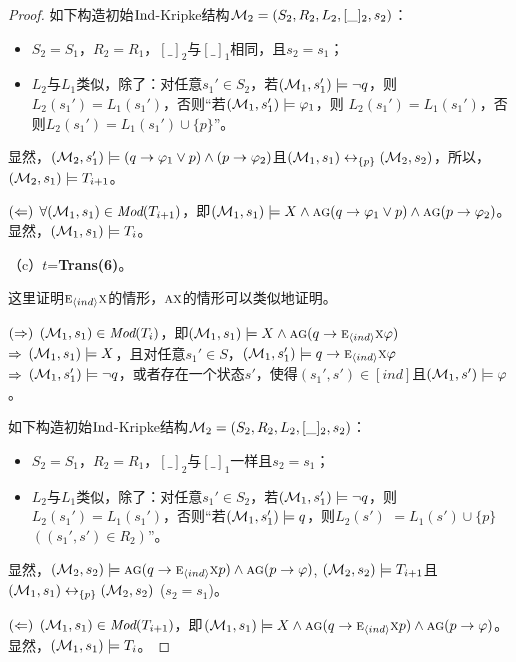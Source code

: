 \begin{proof}
	如下构造初始$\textrm{Ind}$-Kripke结构${\cal M}_2=(S_2,R_2,L_2,[\_]_2,s_2)$：
	\begin{itemize}
		\item $S_2=S_1$，$R_2=R_1$，$[\_]_2$与$[\_]_1$相同，且$s_2=s_1$；
		\item $L_2$与$L_1$类似，除了：对任意$s_1'\in S_2$，若$({\cal M}_1, s_1') \models \neg q$，则$L_2(s_1') = L_1(s_1')$，否则“若$({\cal M}_1,s_1') \models \varphi_1$，则 $L_2(s_1')=L_1(s_1')$，否则$L_2(s_1')=L_1(s_1') \cup \{p\}$”。
	\end{itemize}
	显然，$({\cal M}_2,s_1') \models (q\rightarrow \varphi_1 \vee p) \wedge (p \rightarrow \varphi_2)$且$({\cal M}_1, s_1) \leftrightarrow_{\{p\}} ({\cal M}_2, s_2)$，所以，$({\cal M}_2,s_1) \models T_{i+1}$。
	
	$(\Leftarrow)$  $\forall ({\cal M}_1, s_1) \in \textit{Mod}(T_{i+1})$，即$({\cal M}_1,s_1) \models X \wedge \textsc{a}\textsc{g} (q\rightarrow \varphi_1 \vee p) \wedge \textsc{a}\textsc{g}(p \rightarrow \varphi_2)$。 显然，$({\cal M}_1, s_1) \models T_i$。
	
	（c）$t$=\textbf{Trans(6)}。
	
	这里证明$\textsc{e}_{{\langle{ind}\rangle}} \textsc{x}$的情形，$\textsc{a} \textsc{x}$的情形可以类似地证明。
	
	$(\Rightarrow)$ $({\cal M}_1,s_1) \in \textit{Mod}(T_i)$，即$({\cal M}_1,s_1) \models X \wedge \textsc{a}\textsc{g}(q \rightarrow \textsc{e}_{{\langle{ind}\rangle}}\textsc{x} \varphi)$\\
	$\Rightarrow$ $({\cal M}_1,s_1) \models X$，且对任意$s_1'\in S$，$({\cal M}_1,s_1') \models q \rightarrow \textsc{e}_{{\langle{ind}\rangle}} \textsc{x} \varphi$\\
	$\Rightarrow$ $({\cal M}_1,s_1') \models \neg q$，或者存在一个状态$s'$，使得$(s_1', s') \in [ind]$且$({\cal M}_1,s') \models \varphi$。
	
	如下构造初始$\textrm{Ind}$-Kripke结构${\cal M}_2=(S_2,R_2,L_2,[\_]_2,s_2)$：
	\begin{itemize}
		\item $S_2=S_1$，$R_2=R_1$，$[\_]_2$与$[\_]_1$一样且$s_2=s_1$；
		\item $L_2$与$L_1$类似，除了：对任意$s_1'\in S_2$，若$({\cal M}_1, s_1') \models \neg q$，则$L_2(s_1') = L_1(s_1')$，否则“若$({\cal M}_1,s_1') \models q$，则$L_2(s')$ $=L_1(s')\cup \{p\}$ $((s_1',s')\in R_2)$”。
	\end{itemize}
	显然，$({\cal M}_2,s_2) \models \textsc{a}\textsc{g}(q\rightarrow \textsc{e}_{{\langle{ind}\rangle}} \textsc{x} p) \wedge \textsc{a}\textsc{g}(p \rightarrow \varphi)$, $({\cal M}_2,s_2) \models T_{i+1}$且$({\cal M}_1, s_1) \leftrightarrow_{\{p\}} ({\cal M}_2, s_2)$ ($s_2=s_1$)。
	
	$(\Leftarrow)$ $({\cal M}_1, s_1) \in \textit{Mod}(T_{i+1})$，即$({\cal M}_1,s_1) \models X \wedge \textsc{a}\textsc{g}(q\rightarrow \textsc{e}_{{\langle{ind}\rangle}} \textsc{x} p) \wedge \textsc{a}\textsc{g}(p \rightarrow \varphi)$。显然，$({\cal M}_1, s_1) \models T_i$。
\end{proof}

